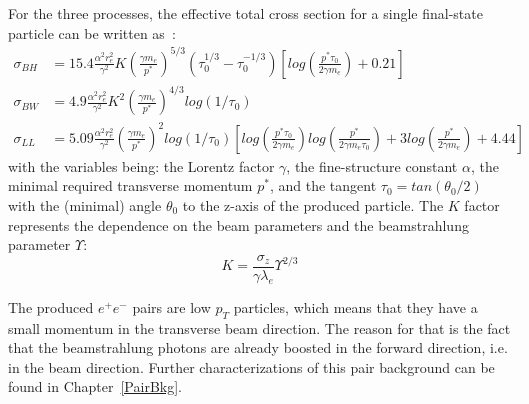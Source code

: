 For the three processes, the effective total cross section for a single final-state particle can be written as~\cite{PairBkg_cross_section}:
\begin{align}
 \sigma_{BH} &= 15.4\frac{\alpha^2 r_e^2}{\gamma^2}K  \left(\frac{\gamma m_e}{p^*}\right)^{5/3}(\tau_0^{1/3}-\tau_0^{-1/3})\left[log\left(\frac{p^*\tau_0}{2\gamma m_e}\right)+0.21\right]\\
 \sigma_{BW} &= 4.9\frac{\alpha^2 r_e^2}{\gamma^2}K^2  \left(\frac{\gamma m_e}{p^*}\right)^{4/3}  log(1/\tau_0)\\
 \sigma_{LL} &= 5.09\frac{\alpha^2 r_e^2}{\gamma^2} \left(\frac{\gamma m_e}{p^*}\right)^2 log(1/\tau_0) \left[log\left(\frac{p^*\tau_0}{2\gamma m_e}\right) log\left(\frac{p^*}{2\gamma m_e\tau_0}\right) + 3 log\left(\frac{p^*}{2\gamma m_e}\right) + 4.44\right]
\end{align}
with the variables being:
the Lorentz factor $\gamma$, 
the fine-structure constant $\alpha$, 
the minimal required transverse momentum $p^*$,
and the tangent $\tau_0=tan(\theta_0/2)$ with the (minimal) angle $\theta_0$ to the z-axis of the produced particle.
The $K$ factor represents the dependence on the beam parameters and the beamstrahlung parameter $\Upsilon$:
\begin{equation}
 K=\frac{\sigma_z}{\gamma\lambda_e}\Upsilon^{2/3}
\end{equation}

The produced $e^+e^-$ pairs are low $p_T$ particles, which means that they have a small momentum in the transverse beam direction.
The reason for that is the fact that the beamstrahlung photons are already boosted in the forward direction, i.e. in the beam direction.
Further characterizations of this pair background can be found in Chapter~\ref{PairBkg}.

